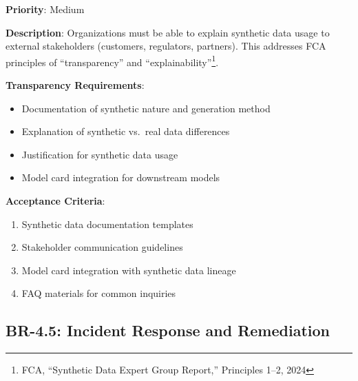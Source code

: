 \begin{tcolorbox}[colback=red!5,colframe=red!70,title=BR-4.4: External Transparency]
\textbf{Priority}: Medium

\textbf{Description}: Organizations must be able to explain synthetic data usage
to external stakeholders (customers, regulators, partners). This addresses FCA
principles of ``transparency'' and ``explainability''\footnote{FCA, ``Synthetic
Data Expert Group Report,'' Principles 1--2, 2024}.

\textbf{Transparency Requirements}:
\begin{itemize}
  \item Documentation of synthetic nature and generation method
  \item Explanation of synthetic vs.\ real data differences
  \item Justification for synthetic data usage
  \item Model card integration for downstream models
\end{itemize}

\textbf{Acceptance Criteria}:
\begin{enumerate}
  \item Synthetic data documentation templates
  \item Stakeholder communication guidelines
  \item Model card integration with synthetic data lineage
  \item FAQ materials for common inquiries
\end{enumerate}
\end{tcolorbox}

\subsection{BR-4.5: Incident Response and Remediation}

